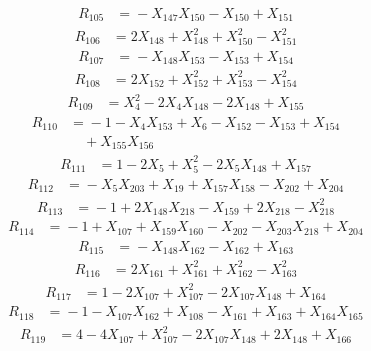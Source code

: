 \[\begin{aligned}
R_{105} &={}-X_{147}X_{150} - X_{150} + X_{151}
\end{aligned}\]
\[\begin{aligned}
R_{106} &={}2X_{148} + X_{148}^{2} + X_{150}^{2} - X_{151}^{2}
\end{aligned}\]
\[\begin{aligned}
R_{107} &={}-X_{148}X_{153} - X_{153} + X_{154}
\end{aligned}\]
\[\begin{aligned}
R_{108} &={}2X_{152} + X_{152}^{2} + X_{153}^{2} - X_{154}^{2}
\end{aligned}\]
\[\begin{aligned}
R_{109} &={}X_{4}^{2} - 2X_{4}X_{148} - 2X_{148} + X_{155}
\end{aligned}\]
\[\begin{aligned}
R_{110} &={}-1 - X_{4}X_{153} + X_{6} - X_{152} - X_{153} + X_{154}\\
&\quad{} + X_{155}X_{156}
\end{aligned}\]
\[\begin{aligned}
R_{111} &={}1 - 2X_{5} + X_{5}^{2} - 2X_{5}X_{148} + X_{157}
\end{aligned}\]
\[\begin{aligned}
R_{112} &={}-X_{5}X_{203} + X_{19} + X_{157}X_{158} - X_{202} + X_{204}
\end{aligned}\]
\[\begin{aligned}
R_{113} &={}-1 + 2X_{148}X_{218} - X_{159} + 2X_{218} - X_{218}^{2}
\end{aligned}\]
\[\begin{aligned}
R_{114} &={}-1 + X_{107} + X_{159}X_{160} - X_{202} - X_{203}X_{218} + X_{204}
\end{aligned}\]
\[\begin{aligned}
R_{115} &={}-X_{148}X_{162} - X_{162} + X_{163}
\end{aligned}\]
\[\begin{aligned}
R_{116} &={}2X_{161} + X_{161}^{2} + X_{162}^{2} - X_{163}^{2}
\end{aligned}\]
\[\begin{aligned}
R_{117} &={}1 - 2X_{107} + X_{107}^{2} - 2X_{107}X_{148} + X_{164}
\end{aligned}\]
\[\begin{aligned}
R_{118} &={}-1 - X_{107}X_{162} + X_{108} - X_{161} + X_{163} + X_{164}X_{165}
\end{aligned}\]
\[\begin{aligned}
R_{119} &={}4 - 4X_{107} + X_{107}^{2} - 2X_{107}X_{148} + 2X_{148} + X_{166}
\end{aligned}\]
